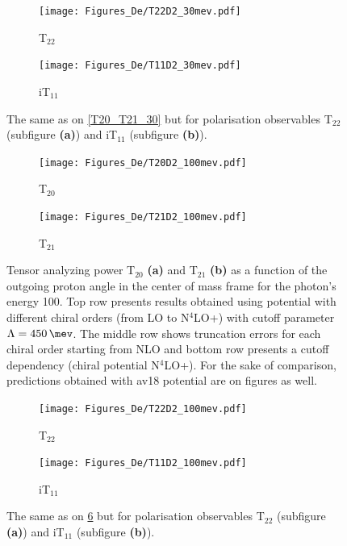     \begin{figure}[htb]
        \centering
        \begin{subfigure}[b]{0.46\textwidth}
            \texttt{[image: Figures\_De/T22D2\_30mev.pdf]}
            \caption{T$_{22}$}
            \label{T22_30_vert}
        \end{subfigure}
        \begin{subfigure}[b]{0.46\textwidth}
            \texttt{[image: Figures\_De/T11D2\_30mev.pdf]}
            \caption{iT$_{11}$}
            \label{T11_30_vert}
        \end{subfigure}
        \caption{The same as on \ref{T20_T21_30} but for polarisation observables
        T$_{22}$ (subfigure {\bf (a)}) and iT$_{11}$ (subfigure {\bf (b)}).}
        \label{T22_T11_30}
    \end{figure}

    \begin{figure}[htb]
        \centering
        \begin{subfigure}[b]{0.46\textwidth}
            \texttt{[image: Figures\_De/T20D2\_100mev.pdf]}
            \caption{T$_{20}$}
            \label{T20_100_vert}
        \end{subfigure}
        \begin{subfigure}[b]{0.46\textwidth}
            \texttt{[image: Figures\_De/T21D2\_100mev.pdf]}
            \caption{T$_{21}$}
            \label{T21_100_vert}
        \end{subfigure}
        \caption{Tensor analyzing power T$_{20}$  {\bf (a)}
        and T$_{21}$ {\bf (b)}
        as a function of the outgoing proton angle in the center of mass frame 
        for the photon's energy \SI{100}{\mev}.
        Top row presents results obtained using potential
        with different chiral orders (from LO to N$^4$LO+) with cutoff parameter $\Lambda=\SI{450}{\mev}$.
        The middle row shows truncation errors for each 
        chiral order starting from NLO and
        bottom row presents a cutoff dependency (chiral potential N$^4$LO+).
        For the sake of comparison, predictions obtained with \gls*{av18} potential are on figures as well.}
        \label{T20_T21_100}
    \end{figure}

    \begin{figure}[htb]
        \centering
        \begin{subfigure}[b]{0.46\textwidth}
            \texttt{[image: Figures\_De/T22D2\_100mev.pdf]}
            \caption{T$_{22}$}
            \label{T22_100_vert}
        \end{subfigure}
        \begin{subfigure}[b]{0.46\textwidth}
            \texttt{[image: Figures\_De/T11D2\_100mev.pdf]}
            \caption{iT$_{11}$}
            \label{T11_100_vert}
        \end{subfigure}
        \caption{The same as on \ref{T20_T21_100} but for polarisation observables
        T$_{22}$ (subfigure {\bf (a)}) and iT$_{11}$ (subfigure {\bf (b)}).}
        \label{T22_T11_100}
    \end{figure}

